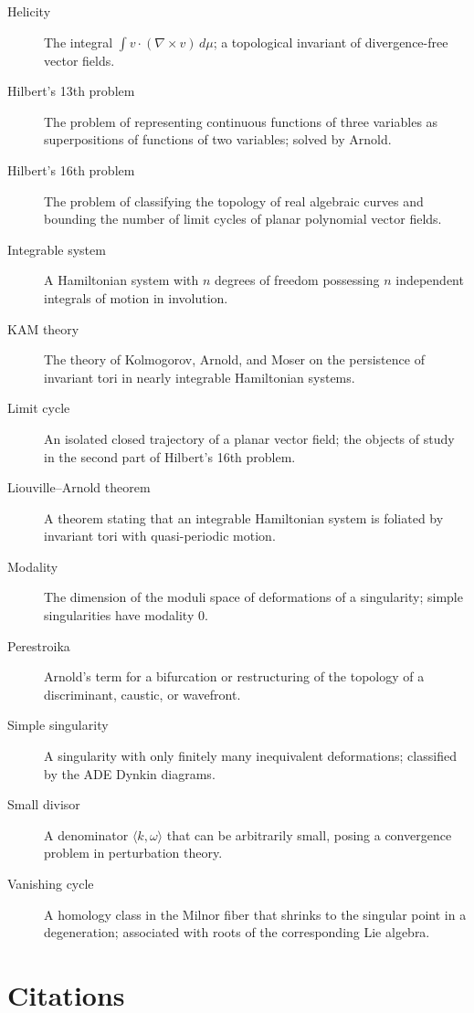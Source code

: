 \begin{description}
    \item[Helicity] The integral \( \int v \cdot (\nabla \times v)\,d\mu\); a topological invariant of divergence-free vector fields.
    \item[Hilbert's 13th problem] The problem of representing continuous functions of three variables as superpositions of functions of two variables; solved by Arnold.
    \item[Hilbert's 16th problem] The problem of classifying the topology of real algebraic curves and bounding the number of limit cycles of planar polynomial vector fields.
    \item[Integrable system] A Hamiltonian system with \(n\) degrees of freedom possessing \(n\) independent integrals of motion in involution.
    \item[KAM theory] The theory of Kolmogorov, Arnold, and Moser on the persistence of invariant tori in nearly integrable Hamiltonian systems.
    \item[Limit cycle] An isolated closed trajectory of a planar vector field; the objects of study in the second part of Hilbert's 16th problem.
    \item[Liouville--Arnold theorem] A theorem stating that an integrable Hamiltonian system is foliated by invariant tori with quasi-periodic motion.
    \item[Modality] The dimension of the moduli space of deformations of a singularity; simple singularities have modality 0.
    \item[Perestroika] Arnold's term for a bifurcation or restructuring of the topology of a discriminant, caustic, or wavefront.
    \item[Simple singularity] A singularity with only finitely many inequivalent deformations; classified by the ADE Dynkin diagrams.
    \item[Small divisor] A denominator \(\langle k,\omega\rangle\) that can be arbitrarily small, posing a convergence problem in perturbation theory.
    \item[Vanishing cycle] A homology class in the Milnor fiber that shrinks to the singular point in a degeneration; associated with roots of the corresponding Lie algebra.
\end{description}

\section{Citations}

